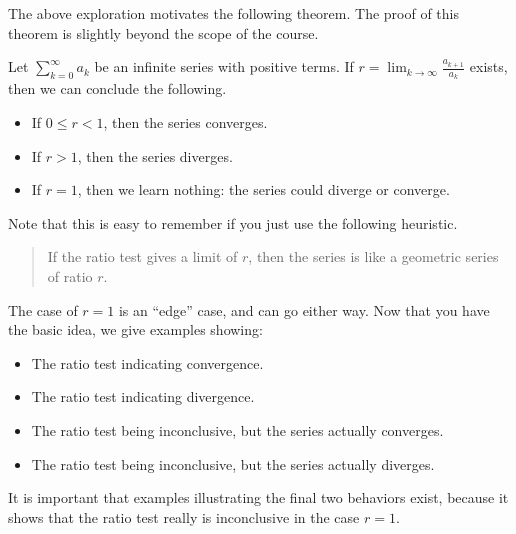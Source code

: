 \documentclass{ximera}
\begin{document}
The above exploration motivates the following theorem.  The proof of
this theorem is slightly beyond the scope of the course.

\begin{theorem}
  Let $\sum_{k=0}^\infty a_k$ be an infinite series with positive terms.  If $r =
  \lim_{k \to \infty} \frac{a_{k+1}}{a_k}$ exists, then we can conclude the following.
  \begin{itemize}
  \item If $0 \leq r < 1$, then the series converges.
  \item If $r>1$, then the series diverges.
  \item If $r = 1$, then we learn nothing:  the series could diverge or converge.
  \end{itemize}
\end{theorem}

Note that this is easy to remember if you just use the following heuristic.
\begin{quote}
  If the ratio test gives a limit of $r$, then the series is like a
  geometric series of ratio $r$.
\end{quote}
The case of $r=1$ is an ``edge'' case, and can go either way.  Now
that you have the basic idea, we give examples showing:
\begin{itemize}
\item The ratio test indicating convergence.
\item The ratio test indicating divergence.
\item The ratio test being inconclusive, but the series actually converges.
\item The ratio test being inconclusive, but the series actually diverges.
\end{itemize}
It is important that examples illustrating the final two behaviors
exist, because it shows that the ratio test really is inconclusive in
the case $r=1$.
\end{document}
